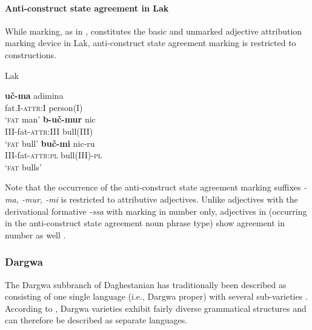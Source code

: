 \paragraph*{Anti\hyp{}construct state agreement in Lak}
While  marking, as in , constitutes the basic and unmarked adjective attribution marking device in Lak, anti\hyp{}construct state agreement marking is restricted to  constructions.
\begin{exe}
\ex 
\rm{Lak \citep[45]{zirkov1955}}%
\begin{xlist}
\ex
\gll	\textbf{uč-ma} adimina\\
	fat.\textsc{I}-\textsc{attr:I} person\textsc{(I)}\\
\glt	‘\textsc{fat} man’
\ex
\gll	\textbf{b-uč-mur} nic\\
	\textsc{III}-fat-\textsc{attr:III} bull\textsc{(III)}\\
\glt	‘\textsc{fat} bull’
\ex
\gll	\textbf{buč-mi} nic-ru\\
	\textsc{III}-fat-\textsc{attr:pl} bull\textsc{(III)}-\textsc{pl}\\
\glt	‘\textsc{fat} bulls’
\end{xlist}
\end{exe}
Note that the occurrence of the anti\hyp{}construct state agreement marking suffixes \textit{-ma, -mur, -mi} is restricted to attributive adjectives. Unlike adjectives with the derivational formative \textit{-ssa} with  marking in number only, adjectives in  (occurring in the anti\hyp{}construct state agreement noun phrase type) show agreement in number as well \citep[45–51]{zirkov1955}.

\subsubsection{Dargwa}
The Dargwa subbranch of Daghestanian has traditionally been described as consisting of one single language (i.e., Dargwa proper) with several sub-varieties \citep[233]{salminen2007}. According to \textcite{korjakov2006a}, Dargwa varieties exhibit fairly diverse grammatical structures and can therefore be described as separate languages.

